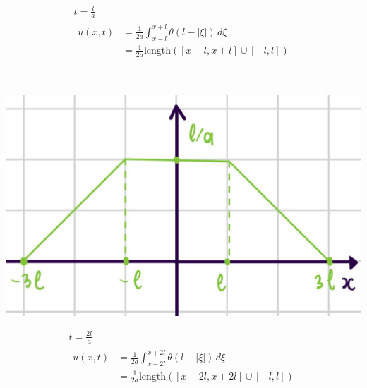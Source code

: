     \begin{minipage}{0.4\textwidth}\raggedleft
      \begin{gather*}
        t = \frac{l}{a} \\
        \begin{split}
        u(x,t) &= \frac{1}{2a} \int_{x- l}^{x + l} \theta(l -|\xi| )\,d\xi \\
               &= \frac{1}{2a} \text{length}\left([x-l,x+l]\cup [-l,l]\right)
        \end{split}
      \end{gather*}
    \end{minipage} \\
    \begin{minipage}{0.4\textwidth}
  \includegraphics[width=1\linewidth]{pictures/u9.jpg} 
    \end{minipage}
    \begin{minipage}{0.4\textwidth}\raggedleft
      \begin{gather*}
        t = \frac{2l}{a} \\
        \begin{split}
        u(x,t) &= \frac{1}{2a} \int_{x- 2l}^{x + 2l} \theta(l -|\xi| )\,d\xi \\
               &= \frac{1}{2a} \text{length}\left([x-2l,x+2l]\cup [-l,l]\right)
        \end{split}
      \end{gather*}
    \end{minipage} \\
